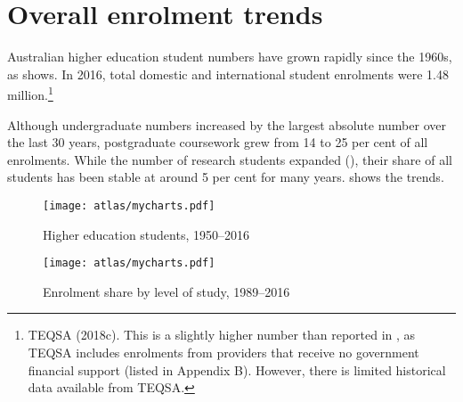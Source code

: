 \documentclass{grattan}
\begin{document}
%
\section{Overall enrolment trends}\label{sec:overall-enrolment-trends}

Australian higher education student numbers have grown rapidly since the 1960s, as  shows. In 2016, total domestic and international student enrolments were 1.48 million.\footnote{TEQSA (2018c). This is a slightly higher number than reported in , as TEQSA includes enrolments from providers that receive no government financial support (listed in Appendix B). However, there is limited historical data available from TEQSA.}

Although undergraduate numbers increased by the largest absolute number over the last 30 years, postgraduate coursework grew from 14 to 25 per cent of all enrolments. While the number of research students expanded (), their share of all students has been stable at around 5 per cent for many years.  shows the trends.


    \begin{figure} %
    \caption{Higher education students, 1950--2016}\label{fig:higher-education-students-19502016}
    \texttt{[image: atlas/mycharts.pdf]}
    \end{figure}



    \begin{figure} %
    \caption{Enrolment share by level of study, 1989--2016}\label{fig:enrolment-share-by-level-of-study-19892016}
    \texttt{[image: atlas/mycharts.pdf]}
    \end{figure}
\end{document}
